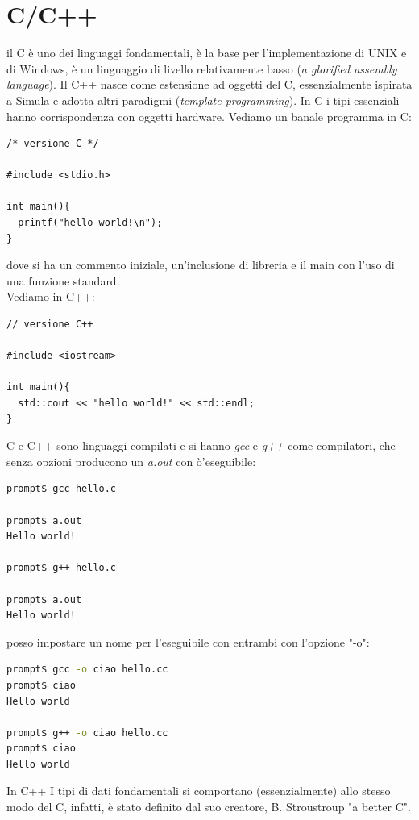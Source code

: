 \documentclass[a4paper,12pt, oneside]{book}
\begin{document}
\chapter{C/C++}
il C è uno dei linguaggi fondamentali, è la base per l'implementazione di UNIX e di Windows, è un linguaggio di livello relativamente basso (\textit{a glorified assembly
	language}). Il C++ nasce come estensione ad oggetti del C, essenzialmente ispirata a Simula e adotta altri paradigmi (\textit{template programming}). In C i tipi essenziali hanno corrispondenza con oggetti hardware. Vediamo un banale programma in C:
\begin{verbatim}
/* versione C */

#include <stdio.h>

int main(){
  printf("hello world!\n");
}
\end{verbatim}
dove si ha un commento iniziale, un'inclusione di libreria e il main con l'uso di una funzione standard.\\ Vediamo in C++:
\begin{verbatim}
// versione C++ 

#include <iostream>

int main(){
  std::cout << "hello world!" << std::endl;
}
\end{verbatim}
C e C++ sono linguaggi compilati e si hanno \textit{gcc} e \textit{g++} come compilatori, che senza opzioni producono un \textit{a.out }con ò'eseguibile:
\begin{shaded}
	\begin{lstlisting}[language=bash]
prompt$ gcc hello.c

prompt$ a.out
Hello world!

prompt$ g++ hello.c

prompt$ a.out
Hello world!
\end{lstlisting}
\end{shaded}
posso impostare un nome per l'eseguibile con entrambi con l'opzione "-o":
\begin{shaded}
	\begin{lstlisting}[language=bash]
prompt$ gcc -o ciao hello.cc
prompt$ ciao
Hello world

prompt$ g++ -o ciao hello.cc
prompt$ ciao
Hello world
\end{lstlisting}
\end{shaded}
In C++ I tipi di dati fondamentali si comportano (essenzialmente) allo stesso modo del C, infatti, è stato definito dal suo creatore, B. Stroustroup
"a better C".
\\
\end{document}
